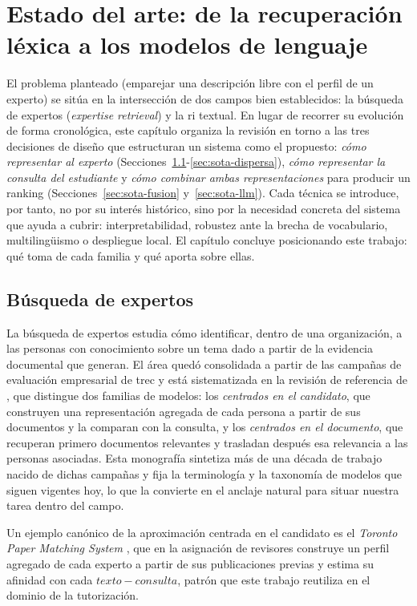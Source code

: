 \chapter[Estado del arte]{Estado del arte: de la recuperación léxica a los modelos de lenguaje}
\label{ch:sota}

El problema planteado (emparejar una descripción libre con el perfil de un experto) se sitúa en la intersección de dos campos bien establecidos: la búsqueda de expertos (\emph{expertise retrieval}) y la \gls{ri} textual.
En lugar de recorrer su evolución de forma cronológica, este capítulo organiza la revisión en torno a las tres decisiones de diseño que estructuran un sistema como el propuesto: \emph{cómo representar al experto} (Secciones~\ref{sec:sota-expertos}-\ref{sec:sota-dispersa}), \emph{cómo representar la consulta del estudiante} y \emph{cómo combinar ambas representaciones} para producir un ranking (Secciones~\ref{sec:sota-fusion} y~\ref{sec:sota-llm}).
Cada técnica se introduce, por tanto, no por su interés histórico, sino por la necesidad concreta del sistema que ayuda a cubrir: interpretabilidad, robustez ante la brecha de vocabulario, multilingüismo o despliegue local.
El capítulo concluye posicionando este trabajo: qué toma de cada familia y qué aporta sobre ellas.

\section{Búsqueda de expertos}
\label{sec:sota-expertos}

La búsqueda de expertos estudia cómo identificar, dentro de una organización, a las personas con conocimiento sobre un tema dado a partir de la evidencia documental que generan.
El área quedó consolidada a partir de las campañas de evaluación empresarial de \gls{trec} y está sistematizada en la revisión de referencia de \citet{balog2012expertise}, que distingue dos familias de modelos: los \emph{centrados en el candidato}, que construyen una representación agregada de cada persona a partir de sus documentos y la comparan con la consulta, y los \emph{centrados en el documento}, que recuperan primero documentos relevantes y trasladan después esa relevancia a las personas asociadas.
Esta monografía sintetiza más de una década de trabajo nacido de dichas campañas y fija la terminología y la taxonomía de modelos que siguen vigentes hoy, lo que la convierte en el anclaje natural para situar nuestra tarea dentro del campo.

Un ejemplo canónico de la aproximación centrada en el candidato es el \emph{Toronto Paper Matching System} \citep{charlin2013tpms}, que en la asignación de revisores construye un perfil agregado de cada experto a partir de sus publicaciones previas y estima su afinidad con cada $texto-consulta$, patrón que este trabajo reutiliza en el dominio de la tutorización.

